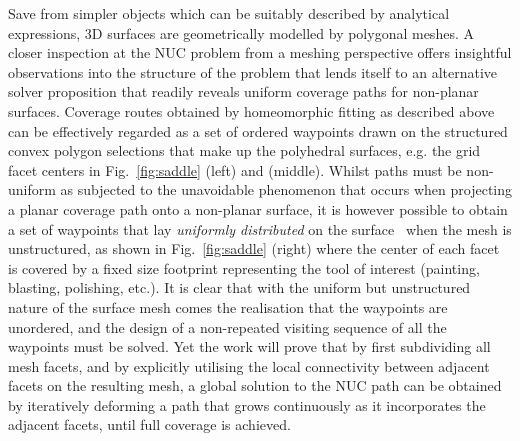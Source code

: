 \documentclass[lettersize,journal]{IEEEtran}
\begin{document}
Save from simpler objects which can be suitably described by analytical expressions, 3D surfaces are geometrically modelled by polygonal meshes. 
A closer inspection at the NUC problem from a meshing perspective offers insightful observations into the structure of the problem that lends itself to an alternative solver 
proposition that readily reveals uniform coverage paths for non-planar surfaces. 
Coverage routes obtained by homeomorphic fitting as described above can be effectively regarded as a set of ordered waypoints drawn on the structured convex polygon selections 
that make up the polyhedral surfaces, e.g. the grid facet centers in Fig.~\ref{fig:saddle} (left) and (middle).
Whilst paths must be non-uniform as subjected to the unavoidable phenomenon that occurs when projecting a planar coverage path onto a non-planar surface, it is however possible to obtain a set of waypoints that lay \textit{uniformly distributed} on the surface~\cite{Obeidat2009Intelligent} when the mesh is unstructured, as  
shown in Fig.~\ref{fig:saddle} (right) where the center of each facet is covered by a fixed size footprint representing the tool of interest (painting, blasting, polishing, etc.). 
It is clear that with the uniform but unstructured nature of the surface mesh comes the realisation that the waypoints are unordered, and the design of a non-repeated 
visiting sequence of all the waypoints must be solved. Yet the work will prove that by first subdividing all mesh facets, and 
by explicitly utilising the local connectivity between adjacent facets on the resulting mesh, a global solution to the NUC path can be obtained by iteratively deforming a path that grows continuously as it incorporates the adjacent facets, until full coverage is achieved. 

\end{document}
